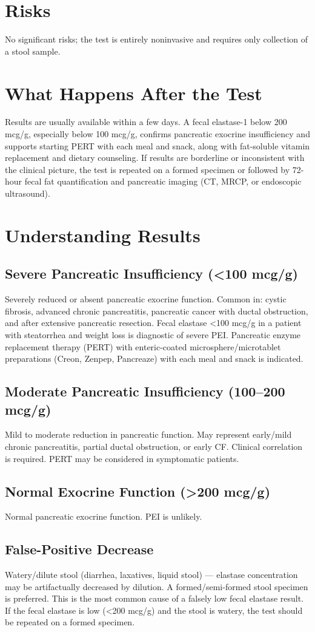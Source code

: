 \section*{Risks}
No significant risks; the test is entirely noninvasive and requires only collection of a stool sample.
\section*{What Happens After the Test}
Results are usually available within a few days. A fecal elastase-1 below 200 mcg/g, especially below 100 mcg/g, confirms pancreatic exocrine insufficiency and supports starting PERT with each meal and snack, along with fat-soluble vitamin replacement and dietary counseling. If results are borderline or inconsistent with the clinical picture, the test is repeated on a formed specimen or followed by 72-hour fecal fat quantification and pancreatic imaging (CT, MRCP, or endoscopic ultrasound).
\section*{Understanding Results}
\subsection*{Severe Pancreatic Insufficiency (<100 mcg/g)}
Severely reduced or absent pancreatic exocrine function. Common in: cystic fibrosis, advanced chronic pancreatitis, pancreatic cancer with ductal obstruction, and after extensive pancreatic resection. Fecal elastase <100 mcg/g in a patient with steatorrhea and weight loss is diagnostic of severe PEI. Pancreatic enzyme replacement therapy (PERT) with enteric-coated microsphere/microtablet preparations (Creon, Zenpep, Pancreaze) with each meal and snack is indicated.
\subsection*{Moderate Pancreatic Insufficiency (100--200 mcg/g)}
Mild to moderate reduction in pancreatic function. May represent early/mild chronic pancreatitis, partial ductal obstruction, or early CF. Clinical correlation is required. PERT may be considered in symptomatic patients.
\subsection*{Normal Exocrine Function (>200 mcg/g)}
Normal pancreatic exocrine function. PEI is unlikely.
\subsection*{False-Positive Decrease}
Watery/dilute stool (diarrhea, laxatives, liquid stool) --- elastase concentration may be artifactually decreased by dilution. A formed/semi-formed stool specimen is preferred. This is the most common cause of a falsely low fecal elastase result. If the fecal elastase is low (<200 mcg/g) and the stool is watery, the test should be repeated on a formed specimen.
